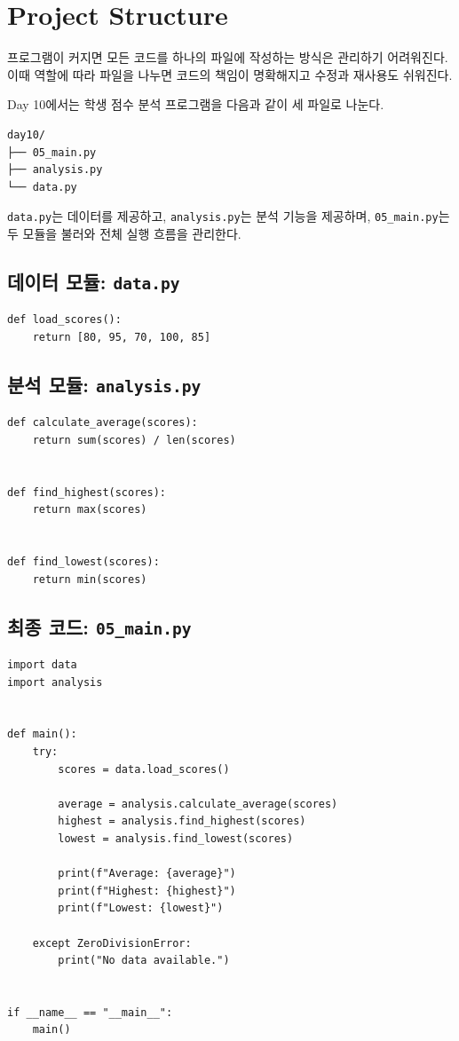 \documentclass[11pt,a4paper]{article}
\begin{document}
\section{Project Structure}

프로그램이 커지면 모든 코드를 하나의 파일에 작성하는 방식은 관리하기 어려워진다. 이때 역할에 따라 파일을 나누면 코드의 책임이 명확해지고 수정과 재사용도 쉬워진다.

Day 10에서는 학생 점수 분석 프로그램을 다음과 같이 세 파일로 나눈다.

\begin{verbatim}
day10/
├── 05_main.py
├── analysis.py
└── data.py
\end{verbatim}

\texttt{data.py}는 데이터를 제공하고, \texttt{analysis.py}는 분석 기능을 제공하며, \texttt{05\_main.py}는 두 모듈을 불러와 전체 실행 흐름을 관리한다.

\subsection{데이터 모듈: \texttt{data.py}}

\begin{lstlisting}
def load_scores():
    return [80, 95, 70, 100, 85]
\end{lstlisting}

\subsection{분석 모듈: \texttt{analysis.py}}

\begin{lstlisting}
def calculate_average(scores):
    return sum(scores) / len(scores)


def find_highest(scores):
    return max(scores)


def find_lowest(scores):
    return min(scores)
\end{lstlisting}

\subsection{최종 코드: \texttt{05\_main.py}}

\begin{lstlisting}
import data
import analysis


def main():
    try:
        scores = data.load_scores()

        average = analysis.calculate_average(scores)
        highest = analysis.find_highest(scores)
        lowest = analysis.find_lowest(scores)

        print(f"Average: {average}")
        print(f"Highest: {highest}")
        print(f"Lowest: {lowest}")

    except ZeroDivisionError:
        print("No data available.")


if __name__ == "__main__":
    main()
\end{lstlisting}
\end{document}

